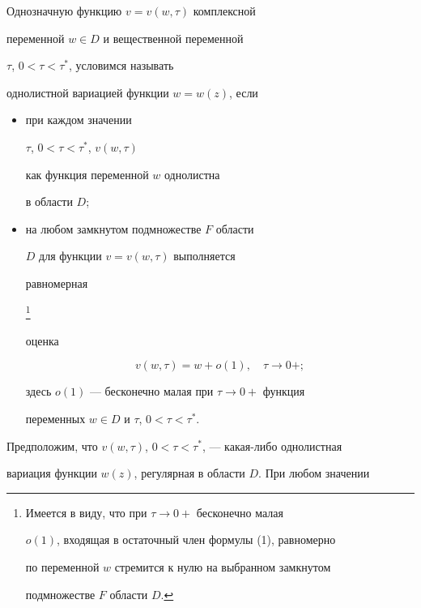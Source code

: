 \begin{defnnonum}


Однозначную функцию $v=v(w,\tau)$ комплексной


переменной $w\in D$ и вещественной переменной 


$\tau$, $0<\tau<\tau^{*}$, условимся называть


однолистной вариацией функции $w=w(z)$, если


\begin{itemize}


\item[а)] при каждом значении 


$\tau$, $0<\tau<\tau^{*}$, $v(w,\tau)$ 


как функция переменной $w$ однолистна


в области $D$;


\item[б)] на любом замкнутом подмножестве $F$ области


$D$ для функции $v=v(w,\tau)$ выполняется


равномерная 


\footnote{Имеется в виду, что при $\tau\to 0+$ бесконечно малая


$o(1)$, входящая в остаточный член формулы (1), равномерно 


по переменной $w$ стремится к нулю на выбранном замкнутом 


подмножестве $F$ области $D$.}


оценка


\begin{equation}


v(w,\tau)=w+o(1),\quad \tau\to 0+;


\end{equation}


здесь $o(1)$ --- бесконечно малая при $\tau\to 0+$ функция 


переменных $w\in D$ и $\tau$, $0<\tau<\tau^{*}$. 


\end{itemize}


\end{defnnonum}


\addtocounter{footnote}{-1}





Предположим, что $v(w,\tau)$, $0<\tau<\tau^{*}$, --- какая-либо однолистная


вариация функции $w(z)$, регулярная в области $D$. При любом значении 


